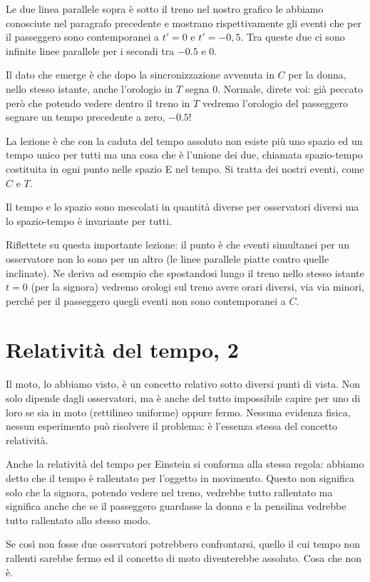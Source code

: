 Le due linea parallele sopra è sotto il treno nel nostro grafico le abbiamo conosciute nel paragrafo precedente e mostrano rispettivamente gli eventi che per il passeggero sono contemporanei a $t'=0$ e $t'=-0,5$. Tra queste due ci sono infinite linee parallele per i secondi tra $-0.5$ e $0$.

Il dato che emerge è che dopo la sincronizzazione avvenuta in $C$ per la donna, nello stesso istante, anche l'orologio in $T$ segna $0$. Normale, direte voi: già peccato però che potendo vedere dentro il treno in $T$ vedremo l'orologio del passeggero segnare un tempo precedente a zero,  $-0.5$!

La lezione è che con la caduta del tempo assoluto non esiste più uno spazio ed un tempo unico per tutti ma una cosa che è l'unione dei due, chiamata spazio-tempo costituita in ogni punto nelle spazio E nel tempo. Si tratta dei nostri eventi, come $C$ e $T$.

Il tempo e lo spazio sono mescolati in quantità diverse per osservatori diversi ma lo spazio-tempo è invariante per tutti.

Riflettete su questa importante lezione: il punto è che eventi simultanei per un osservatore non lo sono per un altro (le linee parallele piatte contro quelle inclinate). Ne deriva ad esempio che spostandosi lungo il treno nello stesso istante $t=0$ (per la signora) vedremo orologi sul treno avere orari diversi, via via minori, perché per il passeggero quegli eventi non sono contemporanei a $C$.


\section{Relatività del tempo, 2}

Il moto, lo abbiamo visto, è un concetto relativo sotto diversi punti di vista. Non solo dipende dagli osservatori, ma è anche del tutto impossibile capire per uno di loro se sia in moto (rettilineo uniforme) oppure fermo. Nessuna evidenza fisica, nessun esperimento può risolvere il problema: è l'essenza stessa del concetto relatività.

Anche la relatività del tempo per Einstein si conforma alla stessa regola: abbiamo detto che il tempo è rallentato per l'oggetto in movimento. Questo non significa solo che la signora, potendo vedere nel treno, vedrebbe tutto rallentato ma significa anche che se il passeggero guardasse la donna e la pensilina vedrebbe tutto rallentato allo stesso modo.

Se così non fosse due osservatori potrebbero confrontarsi, quello il cui tempo non rallenti sarebbe fermo ed il concetto di moto diventerebbe assoluto. Cosa che non è.

